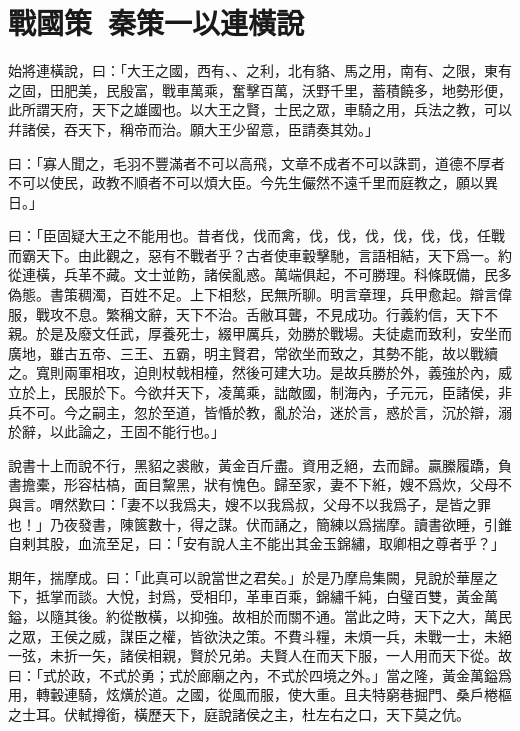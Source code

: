 \section[蘇秦以連橫說秦\quad{\small 戰國策 秦策一}]{{\normalsize 戰國策\ 秦策一}\quad {}以連橫說}
始將連橫說，曰：「大王之國，西有、、之利，北有貉、馬之用，南有、之限，東有
之固，田肥美，民殷富，戰車萬乘，奮擊百萬，沃野千里，蓄積饒多，地勢形便，此所謂天府，天下之雄國也。以大王之賢，士民之眾，車騎之用，兵法之教，可以幷諸侯，吞天下，稱帝而治。願大王少留意，臣請奏其効。」

曰：「寡人聞之，毛羽不豐滿者不可以高飛，文章不成者不可以誅罰，道德不厚者不可以使民，政教不順者不可以煩大臣。今先生儼然不遠千里而庭教之，願以異日。」

曰：「臣固疑大王之不能用也。昔者伐，伐而禽，伐，伐，伐，伐，伐，伐，任戰而霸天下。由此觀之，惡有不戰者乎？古者使車轂擊馳，言語相結，天下爲一。約從連橫，兵革不藏。文士並飭，諸侯亂惑。萬端俱起，不可勝理。科條既備，民多偽態。書策稠濁，百姓不足。上下相愁，民無所聊。明言章理，兵甲愈起。辯言偉服，戰攻不息。繁稱文辭，天下不治。舌敝耳聾，不見成功。行義約信，天下不親。於是及廢文任武，厚養死士，綴甲厲兵，効勝於戰場。夫徒處而致利，安坐而廣地，雖古五帝、三王、五霸，明主賢君，常欲坐而致之，其勢不能，故以戰續之。寬則兩軍相攻，迫則杖戟相橦，然後可建大功。是故兵勝於外，義強於內，威立於上，民服於下。今欲幷天下，凌萬乘，詘敵國，制海內，子元元，臣諸侯，非兵不可。今之嗣主，忽於至道，皆惛於教，亂於治，迷於言，惑於言，沉於辯，溺於辭，以此論之，王固不能行也。」

說書十上而說不行，黑貂之裘敝，黃金百斤盡。資用乏絕，去而歸。贏縢履蹻，負書擔橐，形容枯槁，面目黧黑，狀有愧色。歸至家，妻不下絍，嫂不爲炊，父母不與言。喟然歎曰：「妻不以我爲夫，嫂不以我爲叔，父母不以我爲子，是皆之罪也！」乃夜發書，陳篋數十，得之謀。伏而誦之，簡練以爲揣摩。讀書欲睡，引錐自剌其股，血流至足，曰：「安有說人主不能出其金玉錦繡，取卿相之尊者乎？」

期年，揣摩成。曰：「此真可以說當世之君矣。」於是乃摩烏集闕，見說於華屋之下，抵掌而談。大悅，封爲，受相印，革車百乘，錦繡千純，白璧百雙，黃金萬鎰，以隨其後。約從散橫，以抑強。故相於而關不通。當此之時，天下之大，萬民之眾，王侯之威，謀臣之權，皆欲決之策。不費斗糧，未煩一兵，未戰一士，未絕一弦，未折一矢，諸侯相親，賢於兄弟。夫賢人在而天下服，一人用而天下從。故曰：「式於政，不式於勇；式於廊廟之內，不式於四境之外。」當之隆，黃金萬鎰爲用，轉轂連騎，炫熿於道。之國，從風而服，使大重。且夫特窮巷掘門、桑戶棬樞之士耳。伏軾撙銜，橫歷天下，庭說諸侯之主，杜左右之口，天下莫之伉。

